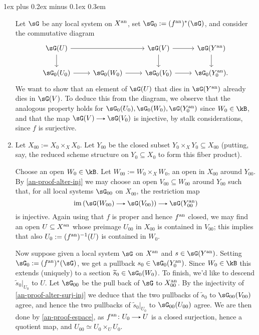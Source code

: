 \documentclass[11pt,leqno]{article}
\makeatletter
\newcommand{\thmheadfont}{\scshape}
\newcommand{\thmhorizspace}{0.3em}
\newcommand{\thmsep}{\hspace{\thmhorizspace}---}
\renewenvironment{proof}[1][Proof]{\par
  \pushQED{\qed}%
  \normalfont%
  \topsep1ex plus 0.2ex minus 0.1ex\relax%
  \labelsep \thmhorizspace\relax%
  \trivlist
  \item[\hskip\labelsep\thmheadfont#1\@addpunct{\thmsep}]\ignorespaces
}{%
  \popQED\endtrivlist\@endpefalse%
}
\theoremstyle{block}
\numberwithin{subblock}{block}
\numberwithin{equation}{subblock}
\newcommand{\arrlen}{1.25em}
\renewcommand{\to}{\mathrel{\tikz[baseline]%
    \draw[>=stealth,->](0,0.5ex)--(\arrlen,0.5ex);}}
\renewcommand{\l}{\left}
\renewcommand{\r}{\right}
\newcommand{\til}{\widetilde}
\renewcommand{\c}{\colon}
\newcommand{\ce}{\mathrel{:=}}%
\newcommand{\iso}{\simeq}
\renewcommand{\im}{\operatorname{im}}
\numberwithin{block}{section}
\makeatother
\begin{document}
\begin{nothing}
\begin{sublemma}
\begin{proof}
\begin{enumerate}[leftmargin=*]
        Let $\sG$ be any local system on $X^{\mathrm{an}}$, set $\sG_0 \ce (f^\an)^*(\sG)$, and consider the commutative diagram
        \[
          \begin{tikzcd}
            \sG(U) \ar[rr] \ar[d] &
            &
            \sG(V) \ar[r] \ar[d] &
            \sG(Y^\an) \ar[d] \\
            \sG_0(U_0) \ar[r] &
            \sG_0(W_0) \ar[r] &
            \sG_0(V_0) \ar[r] &
            \sG_0(Y_0^\an).
          \end{tikzcd}
        \]
        We want to show that an element of $\sG(U)$ that dies in $\sG(Y^\an)$ already dies in $\sG(V)$. To deduce this from the diagram, we observe that the analogous property holds for $\sG_0(U_0), \sG_0(W_0), \sG(Y_0^\an)$ since $W_0 \in \kB$, and that the map $\sG(V) \to \sG(V_0)$ is injective, by stalk considerations, since $f$ is surjective.

      \item Let $X_{00} \ce X_0 \times_X X_0$. Let $Y_{00}$ be the closed subset $Y_0 \times_X Y_0 \subseteq X_{00}$ (putting, say, the reduced scheme structure on $Y_0 \subseteq X_0$ to form this fiber product).

        Choose an open $W_0 \in \kB$. Let $W_{00} \ce W_0 \times_X W_0$, an open in $X_{00}$ around $Y_{00}$. By \cref{an-proof-alter-inj} we may choose an open $V_{00} \subseteq W_{00}$ around $Y_{00}$ such that, for all local systems $\sG_{00}$ on $X_{00}$, the restriction map
        \begin{equation}
          \label{an-proof-alter-surj-inj}
          \im\l(\sG(W_{00}) \to \sG(V_{00})\r) \to \sG(Y_{00}^\an)
        \end{equation}
        is injective. Again using that $f$ is proper and hence $f^{\mathrm{an}}$ closed, we may find an open $U \subseteq X^{\mathrm{an}}$ whose preimage $U_{00}$ in $X_{00}$ is contained in $V_{00}$; this implies that also $U_0 \ce (f^\an)^{-1}(U)$ is contained in $W_0$.

        Now suppose given a local system $\sG$ on $X^{\mathrm{an}}$ and $s \in \sG(Y^\an)$. Setting $\sG_0 \ce (f^\an)^*(\sG)$, we get a pullback $s_0 \in \sG_0(Y_0^\an)$. Since $W_0 \in \kB$ this extends (uniquely) to a section $\til{s}_0 \in \sG_0(W_0)$. To finish, we'd like to descend $\til{s}_0|_{U_0}$ to $U$. Let $\sG_{00}$ be the pull back of $\sG$ to $X_{00}^{\mathrm{an}}$. By the injectivity of \cref{an-proof-alter-surj-inj} we deduce that the two pullbacks of $\til{s}_0$ to $\sG_{00}(V_{00})$ agree, and hence the two pullbacks of $\til{s}_0|_{U_0}$ to $\sG_{00}(U_{00})$ agree. We are then done by \cref{an-proof-espace}, as $f^\an \c U_0 \to U$ is a closed surjection, hence a quotient map, and $U_{00} \iso U_0 \times_U U_0$. \qedhere
      \end{enumerate}
    \end{proof}
  \end{sublemma}
  

\end{nothing}
\end{document}
